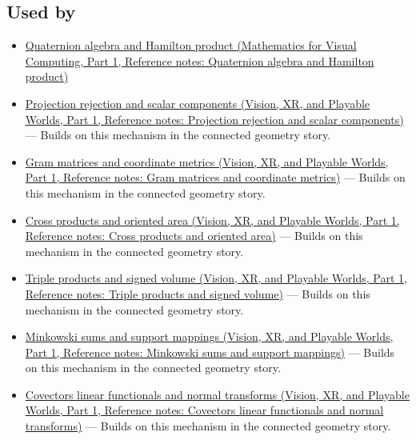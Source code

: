 \subsection{Used by}\label{appendix-8bc4e8fc547c-used-by}

\hypertarget{appendix-8bc4e8fc547c-used-by}{}

\begin{itemize}
\item
  \href{../02-Mathematics-for-Visual-Computing-P01/main.pdf\#nameddest=appendix-965d9260eeab}{Quaternion algebra and Hamilton product (Mathematics for Visual Computing, Part 1, Reference notes: Quaternion algebra and Hamilton product)}
\item
  \href{../07-Vision-XR-and-Playable-Worlds-P01/main.pdf\#nameddest=appendix-505a502c372a}{Projection rejection and scalar components (Vision, XR, and Playable Worlds, Part 1, Reference notes: Projection rejection and scalar components)} --- Builds on this mechanism in the connected geometry story.
\item
  \href{../07-Vision-XR-and-Playable-Worlds-P01/main.pdf\#nameddest=appendix-3b863809f82a}{Gram matrices and coordinate metrics (Vision, XR, and Playable Worlds, Part 1, Reference notes: Gram matrices and coordinate metrics)} --- Builds on this mechanism in the connected geometry story.
\item
  \href{../07-Vision-XR-and-Playable-Worlds-P01/main.pdf\#nameddest=appendix-2391db8052b1}{Cross products and oriented area (Vision, XR, and Playable Worlds, Part 1, Reference notes: Cross products and oriented area)} --- Builds on this mechanism in the connected geometry story.
\item
  \href{../07-Vision-XR-and-Playable-Worlds-P01/main.pdf\#nameddest=appendix-5caa058bd9c7}{Triple products and signed volume (Vision, XR, and Playable Worlds, Part 1, Reference notes: Triple products and signed volume)} --- Builds on this mechanism in the connected geometry story.
\item
  \href{../07-Vision-XR-and-Playable-Worlds-P01/main.pdf\#nameddest=appendix-215ac7099a82}{Minkowski sums and support mappings (Vision, XR, and Playable Worlds, Part 1, Reference notes: Minkowski sums and support mappings)} --- Builds on this mechanism in the connected geometry story.
\item
  \href{../07-Vision-XR-and-Playable-Worlds-P01/main.pdf\#nameddest=appendix-46da295c6787}{Covectors linear functionals and normal transforms (Vision, XR, and Playable Worlds, Part 1, Reference notes: Covectors linear functionals and normal transforms)} --- Builds on this mechanism in the connected geometry story.

\end{itemize}
